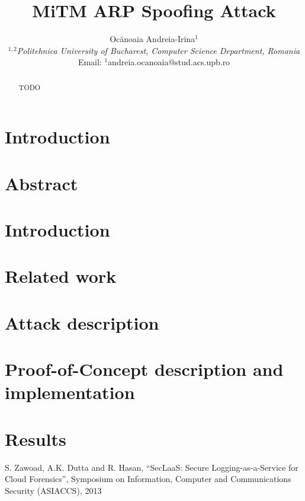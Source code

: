 \documentclass[10pt,a4paper,english,twocolumn]{IEEEtran}
\begin{document}
\title{MiTM ARP Spoofing Attack}

\author{Ocănoaia Andreia-Irina$^{1}$ \\
$^{1,2}$\emph{Politehnica University of Bucharest, Computer Science Department, Romania}\\
Email: $^{1}$andreia.ocanoaia@stud.acs.upb.ro}

\maketitle

\begin{abstract}
TODO
\end{abstract}

\section{Introduction}
\section{Abstract}
\section{Introduction}
\section{Related work}
\section{Attack description}
\section{Proof-of-Concept description and implementation}
\section{Results}

\begin{thebibliography}{7}
	S. Zawoad, A.K. Dutta and R. Hasan, ``SecLaaS: Secure Logging-as-a-Service for Cloud Forensics'', {Symposium on Information, Computer and Communications Security (ASIACCS)}, 2013
\end{thebibliography}
\end{document}
